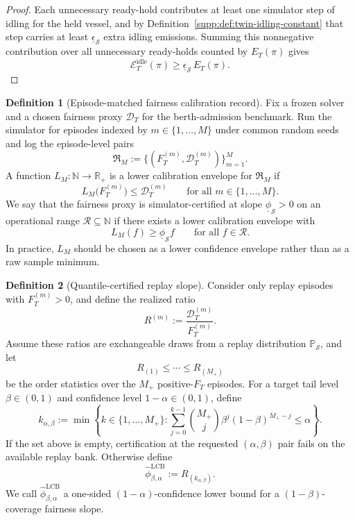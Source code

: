 \documentclass[11pt]{article}
\newcommand{\Prob}{\mathbb{P}}
\newcommand{\1}{\mathbf{1}}
\theoremstyle{definition}
\newtheorem{definition}{Definition}[section]
\theoremstyle{plain}
\theoremstyle{remark}
\begin{document}
\begin{proof}
Each unnecessary ready-hold contributes at least one simulator step of idling for the held vessel, and by Definition~\ref{supp:def:twin-idling-constant} that step carries at least $\underline\epsilon_{\mathcal S}$ extra idling emissions. Summing this nonnegative contribution over all unnecessary ready-holds counted by $E_T(\pi)$ gives
\[
\mathcal E_T^{\mathrm{idle}}(\pi)
\ge
\underline\epsilon_{\mathcal S}\,E_T(\pi).
\]
\end{proof}

\begin{definition}[Episode-matched fairness calibration record]
\label{supp:def:episode-calibration-record}
Fix a frozen solver and a chosen fairness proxy $\mathcal D_T$ for the berth-admission benchmark. Run the simulator for episodes indexed by $m\in\{1,\dots,M\}$ under common random seeds and log the episode-level pairs
\[
\mathfrak R_M
:=
\bigl\{(F_T^{(m)},\mathcal D_T^{(m)})\bigr\}_{m=1}^M.
\]
A function $L_M:\mathbb N\to\mathbb R_+$ is a lower calibration envelope for $\mathfrak R_M$ if
\[
L_M\bigl(F_T^{(m)}\bigr)
\le
\mathcal D_T^{(m)}
\qquad\text{for all }m\in\{1,\dots,M\}.
\]
We say that the fairness proxy is simulator-certified at slope $\underline\phi_{\mathcal S}>0$ on an operational range $\mathcal R\subseteq\mathbb N$ if there exists a lower calibration envelope with
\[
L_M(f)\ge \underline\phi_{\mathcal S} f
\qquad\text{for all }f\in\mathcal R.
\]
In practice, $L_M$ should be chosen as a lower confidence envelope rather than as a raw sample minimum.
\end{definition}

\begin{definition}[Quantile-certified replay slope]
\label{supp:def:quantile-certified-slope}
Consider only replay episodes with $F_T^{(m)}>0$, and define the realized ratio
\[
R^{(m)} := \frac{\mathcal D_T^{(m)}}{F_T^{(m)}}.
\]
Assume these ratios are exchangeable draws from a replay distribution $\Prob_{\mathcal S}$, and let
\[
R_{(1)}\le \cdots \le R_{(M_+)}
\]
be the order statistics over the $M_+$ positive-$F_T$ episodes. For a target tail level $\beta\in(0,1)$ and confidence level $1-\alpha\in(0,1)$, define
\[
k_{\alpha,\beta}
:=
\min\left\{
 k\in\{1,\dots,M_+\}:
 \sum_{j=0}^{k-1}\binom{M_+}{j}\beta^j(1-\beta)^{M_+-j}\le \alpha
\right\}.
\]
If the set above is empty, certification at the requested $(\alpha,\beta)$ pair fails on the available replay bank. Otherwise define
\[
\widehat\phi^{\mathrm{LCB}}_{\beta,\alpha} := R_{(k_{\alpha,\beta})}.
\]
We call $\widehat\phi^{\mathrm{LCB}}_{\beta,\alpha}$ a one-sided $(1-\alpha)$-confidence lower bound for a $(1-\beta)$-coverage fairness slope.
\end{definition}
\end{document}

